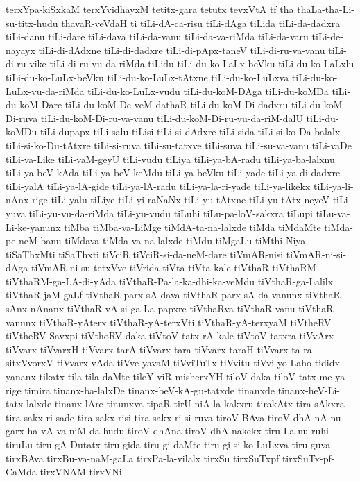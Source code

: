 {terxYpa-kiSxkaM
terxYvidhayxM
tetitx-gara
tetutx
tevxVtA
tf
tha
thaLa-tha-Li-su-titx-hudu
thavaR-veVdaH
ti
tiLi-dA-ca-risu
tiLi-dAga
tiLida
tiLi-da-dadxra
tiLi-danu
tiLi-dare
tiLi-dava
tiLi-da-vanu
tiLi-da-va-riMda
tiLi-da-varu
tiLi-de-nayayx
tiLi-di-dAdxne
tiLi-di-dadxre
tiLi-di-pApx-taneV
tiLi-di-ru-va-vanu
tiLi-di-ru-vike
tiLi-di-ru-vu-da-riMda
tiLidu
tiLi-du-ko-LaLx-beVku
tiLi-du-ko-LaLxlu
tiLi-du-ko-LuLx-beVku
tiLi-du-ko-LuLx-tAtxne
tiLi-du-ko-LuLxva
tiLi-du-ko-LuLx-vu-da-riMda
tiLi-du-ko-LuLx-vudu
tiLi-du-koM-DAga
tiLi-du-koMDa
tiLi-du-koM-Dare
tiLi-du-koM-De-veM-dathaR
tiLi-du-koM-Di-dadxru
tiLi-du-koM-Di-ruva
tiLi-du-koM-Di-ru-va-vanu
tiLi-du-koM-Di-ru-vu-da-riM-dalU
tiLi-du-koMDu
tiLi-dupapx
tiLi-salu
tiLisi
tiLi-si-dAdxre
tiLi-sida
tiLi-si-ko-Da-balalx
tiLi-si-ko-Du-tAtxre
tiLi-si-ruva
tiLi-su-tatxve
tiLi-suva
tiLi-su-va-vanu
tiLi-vaDe
tiLi-va-Like
tiLi-vaM-geyU
tiLi-vudu
tiLiya
tiLi-ya-bA-radu
tiLi-ya-ba-lalxnu
tiLi-ya-beV-kAda
tiLi-ya-beV-keMdu
tiLi-ya-beVku
tiLi-yade
tiLi-ya-di-dadxre
tiLi-yalA
tiLi-ya-lA-gide
tiLi-ya-lA-radu
tiLi-ya-la-ri-yade
tiLi-ya-likekx
tiLi-ya-li-nAnx-rige
tiLi-yalu
tiLiye
tiLi-yi-raNaNx
tiLi-yu-tAtxne
tiLi-yu-tAtx-neyeV
tiLi-yuva
tiLi-yu-vu-da-riMda
tiLi-yu-vudu
tiLuhi
tiLu-pa-loV-sakxra
tiLupi
tiLu-va-Li-ke-yanunx
tiMba
tiMba-va-LiMge
tiMdA-ta-na-lalxde
tiMda
tiMdaMte
tiMda-pe-neM-banu
tiMdava
tiMda-va-na-lalxde
tiMdu
tiMgaLu
tiMthi-Niya
tiSaThxMti
tiSaThxti
tiVciR
tiVciR-si-da-neM-dare
tiVmAR-nisi
tiVmAR-ni-si-dAga
tiVmAR-ni-su-tetxVve
tiVrida
tiVta
tiVta-kale
tiVthaR
tiVthaRM
tiVthaRM-ga-LA-di-yAda
tiVthaR-Pa-la-ka-dhi-ka-veMdu
tiVthaR-ga-Lalilx
tiVthaR-jaM-gaLf
tiVthaR-parx-sA-dava
tiVthaR-parx-sA-da-vanunx
tiVthaR-sAnx-nAnanx
tiVthaR-vA-si-ga-La-papxre
tiVthaRva
tiVthaR-vanu
tiVthaR-vanunx
tiVthaR-yAterx
tiVthaR-yA-terxVti
tiVthaR-yA-terxyaM
tiVtheRV
tiVtheRV-Savxpi
tiVthoRV-daka
tiVtoV-tatx-rA-kale
tiVtoV-tatxra
tiVvArx
tiVvarx
tiVvarxH
tiVvarx-tarA
tiVvarx-tara
tiVvarx-taraH
tiVvarx-ta-ra-sitxVvorxV
tiVvarx-vAda
tiVve-yavaM
tiVviTuTx
tiVvitu
tiVvi-yo-Laho
tididx-yananx
tikatx
tila
tila-daMte
tileY-viR-misherxYH
tiloV-daka
tiloV-tatx-me-ya-rige
timira
tinanx-ba-lalxDe
tinanx-beV-kA-gu-tatxde
tinanxde
tinanx-heV-Li-tatx-lalxde
tinanx-lAre
tinunxva
tipaR
tirU-niA-la-kakxru
tirakAtx
tira-sAkxra
tira-sakx-ri-sade
tira-sakx-risi
tira-sakx-ri-si-ruva
tiroV-BAva
tiroV-dhA-nA-nu-garx-ha-vA-va-niM-da-hudu
tiroV-dhAna
tiroV-dhA-nakekx
tiru-La-nu-ruhi
tiruLu
tiru-gA-Dutatx
tiru-gida
tiru-gi-daMte
tiru-gi-si-ko-LuLxva
tiru-guva
tirxBAva
tirxBu-va-naM-gaLa
tirxPa-la-vilalx
tirxSu
tirxSuTxpf
tirxSuTx-pf-CaMda
tirxVNAM
tirxVNi
}

